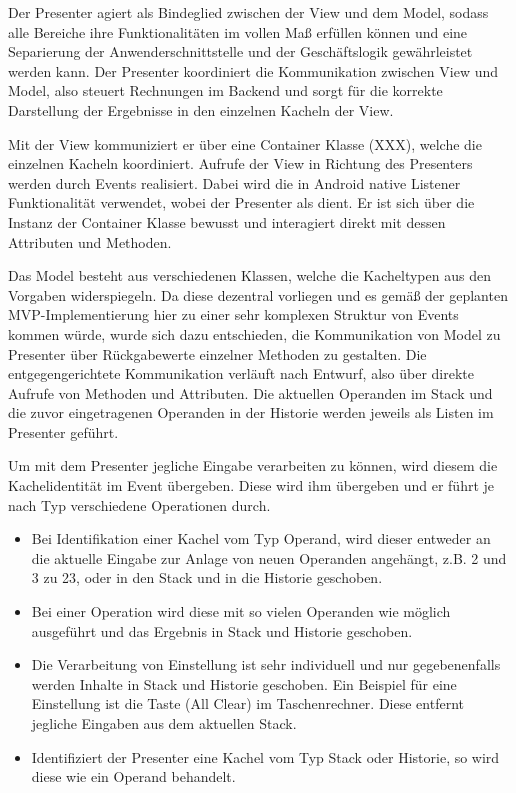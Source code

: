 Der Presenter agiert als Bindeglied zwischen der View und dem Model, sodass alle Bereiche ihre Funktionalitäten im vollen Maß erfüllen können und eine Separierung der Anwenderschnittstelle und der Geschäftslogik gewährleistet werden kann. Der Presenter koordiniert die Kommunikation zwischen View und Model, also steuert Rechnungen im Backend und sorgt für die korrekte Darstellung der Ergebnisse in den einzelnen Kacheln der View.

Mit der View kommuniziert er über eine Container Klasse (XXX), welche die einzelnen Kacheln koordiniert. Aufrufe der View in Richtung des Presenters werden durch Events realisiert. Dabei wird die in Android native Listener Funktionalität verwendet, wobei der Presenter als  dient. Er ist sich über die Instanz der Container Klasse bewusst und interagiert direkt mit dessen Attributen und Methoden.

Das Model besteht aus verschiedenen Klassen, welche die Kacheltypen aus den Vorgaben widerspiegeln. Da diese dezentral vorliegen und es gemäß der geplanten MVP-Implementierung hier zu einer sehr komplexen Struktur von Events kommen würde, wurde sich dazu entschieden, die Kommunikation von Model zu Presenter über Rückgabewerte einzelner Methoden zu gestalten. Die entgegengerichtete Kommunikation verläuft nach Entwurf, also über direkte Aufrufe von Methoden und Attributen. Die aktuellen Operanden im Stack und die zuvor eingetragenen Operanden in der Historie werden jeweils als Listen im Presenter geführt.

Um mit dem Presenter jegliche Eingabe verarbeiten zu können, wird diesem die Kachelidentität im Event übergeben. Diese wird ihm übergeben und er führt je nach Typ verschiedene Operationen durch.

\begin{itemize}
\item Bei Identifikation einer Kachel vom Typ Operand, wird dieser entweder an die aktuelle Eingabe zur Anlage von neuen Operanden angehängt, z.B. 2 und 3 zu 23, oder in den Stack und in die Historie geschoben. 
\item Bei einer Operation wird diese mit so vielen Operanden wie möglich ausgeführt und das Ergebnis in Stack und Historie geschoben.
\item Die Verarbeitung von Einstellung ist sehr individuell und nur gegebenenfalls werden Inhalte in Stack und Historie geschoben. Ein Beispiel für eine Einstellung ist die Taste  (All Clear) im Taschenrechner. Diese entfernt jegliche Eingaben aus dem aktuellen Stack.
\item Identifiziert der Presenter eine Kachel vom Typ Stack oder Historie, so wird diese wie ein Operand behandelt.
\end{itemize}

